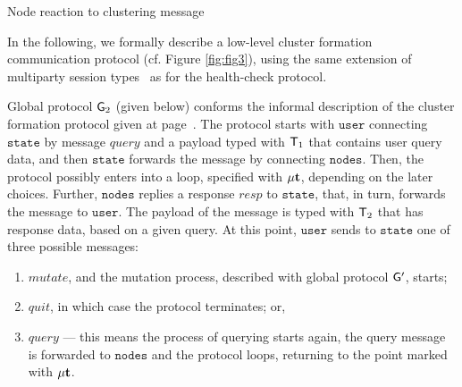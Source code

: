 \begin{algorithm}[H]
	\SetAlgoLined
	\caption{Node reaction to clustering message}
	\label{alg:alg4}
\end{algorithm}

In the following, we formally describe a low-level cluster formation communication protocol (cf. Figure \ref{fig:fig3}), using the same extension of multiparty session types~\cite{HuY17} as for the health-check protocol.

Global protocol ${\sf G}_2$ (given below) conforms the informal description of the cluster formation protocol given at page~\pageref{cluster_formation_informal_description}. 
The protocol starts with $\mathtt{user}$ connecting $\mathtt{state}$ by message $\mathit{query}$ and a payload typed with ${\mathsf T}_1$ that contains user query data, and  then $\mathtt{state}$ forwards the message by connecting $\mathtt{nodes}$. 
Then, the protocol possibly enters into a loop, specified with $\mu\textbf{t}$, depending on the later choices. 
Further, $\mathtt{nodes}$ replies a response $\mathit{resp}$ to $\mathtt{state}$, that, in turn, forwards the message to $\mathtt{user}$. The payload of the message is typed with ${\mathsf T}_2$ that has response data, based on a given query. 
At this point, $\mathtt{user}$  sends to $\mathtt{state}$ one of three possible messages:

\begin{enumerate}[start=1,label={(\bfseries \arabic*)}]
	\item $\mathit{mutate}$, and the mutation process, described with global protocol ${\sf G}'$, starts; 
	\item $\mathit{quit}$, in which case the protocol terminates; or,
	\item $\mathit{query}$ --- this means the process of querying starts again, the query message is forwarded to $\mathtt{nodes}$ and the protocol loops, returning to the point marked with $\mu\textbf{t}$.
\end{enumerate}

